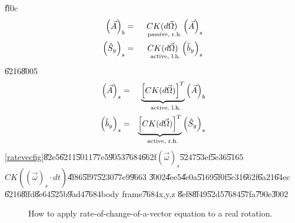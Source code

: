 \documentclass[12pt]{article}
\begin{document}
\U{ff0c}%
\begin{eqnarray*}
\left( \vec{A}\right) _{b} &=&\underset{\text{passive, r.h.}}{CK(d\vec{\Omega%
})}\left( \vec{A}\right) _{s} \\
\left( \hat{S}_{y}\right) _{s} &=&\underset{\text{active, l.h.}}{CK(d\vec{%
\Omega})}\left( \hat{b}_{y}\right) _{s}
\end{eqnarray*}%
\U{6216}\U{8005}%
\begin{eqnarray}
\left( \vec{A}\right) _{s} &=&\underset{\text{active, l.h.}}{\underbrace{%
\left[ CK(d\vec{\Omega})\right] ^{T}}}\left( \vec{A}\right) _{b}
\label{frametrans} \\
\left( \hat{b}_{y}\right) _{s} &=&\underset{\text{active, r.h.}}{\underbrace{%
\left[ CK(d\vec{\Omega})\right] ^{T}}}\left( \hat{S}_{y}\right) _{s}
\label{vecrot}
\end{eqnarray}%
\ref{ratevecfig}\U{82e5}\U{6211}\U{5011}\U{77e5}\U{9053}\U{7684}\U{662f}$%
\left( \vec{\omega}\right) _{s}$\U{5247}\U{53ef}\U{5e36}\U{5165}$CK(\left( 
\vec{\omega}\right) _{s}\cdot dt)$\U{4f86}\U{5f97}\U{5230}\U{77e9}\U{9663}%
\U{3002}\U{4ee5}\U{4e0a}\U{5169}\U{5f0f}\U{5c31}\U{662f}\U{6a21}\U{64ec}%
\U{6216}\U{8ffd}\U{8e64}\U{525b}\U{9ad4}\U{7684}body frame\U{7684}x,y,z%
\U{8ef8}\U{8f49}\U{52d5}\U{7684}\U{57fa}\U{790e}\U{3002}

\begin{figure}[th]
\caption{How to apply rate-of-change-of-a-vector equation to a real
rotation. }
\label{szsbtdtfig}
\begin{center}
\end{center}
\end{figure}
\end{document}
